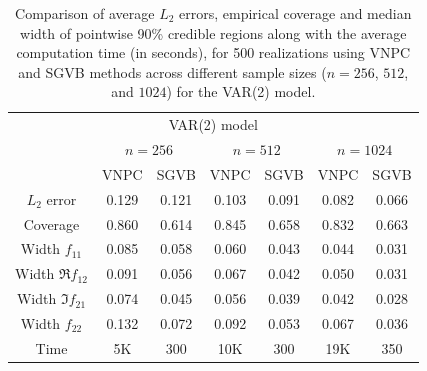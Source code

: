 \documentclass[%
 reprint,
 amsmath,amssymb,
 aps,
 nofootinbib,
]{revtex4-2}
\begin{document}
\begingroup
\renewcommand{\arraystretch}{1.4} 
\begin{table}[h]
\centering
\begin{tabular}{ccccccc}
\hline
\multicolumn{7}{c}{VAR(2) model} \\
\quad & \multicolumn{2}{c}{$n=256$}  & \multicolumn{2}{c}{$n = 512$}  & \multicolumn{2}{c}{$n = 1024$}\\
\hline
\quad & {VNPC} & {SGVB} & {VNPC} & {SGVB} & {VNPC} & {SGVB}\\
{$L_2$ error} & 0.129 & 0.121 & 0.103 & 0.091 & 0.082 & 0.066\\
{Coverage} & 0.860 & 0.614 & 0.845 & 0.658 & 0.832 & 0.663\\
{Width $f_{11}$} & 0.085 & 0.058 & 0.060 & 0.043 & 0.044 & 0.031\\
{Width $\Re f_{12}$} & 0.091 & 0.056 & 0.067 & 0.042 & 0.050 & 0.031\\
{Width $\Im f_{21}$} & 0.074 & 0.045 & 0.056 & 0.039 & 0.042 & 0.028\\
{Width $f_{22}$} & 0.132 & 0.072 & 0.092 & 0.053 & 0.067& 0.036\\
{Time} & 5{\rm K} & 300 & 10{\rm K} & 300 & 19{\rm K} & 350\\
\hline
\end{tabular}
\caption{{\small Comparison of average  $L_2$ errors, empirical coverage and median width of pointwise 90\%
credible regions along with the average computation time (in seconds), for 500 realizations using VNPC and \ac{SGVB} methods across different sample sizes ($n=256$, $512$, and $1024$) for the VAR(2) model.}}
\label{table l1l2 var2} 
\end{table}
\end{document}

